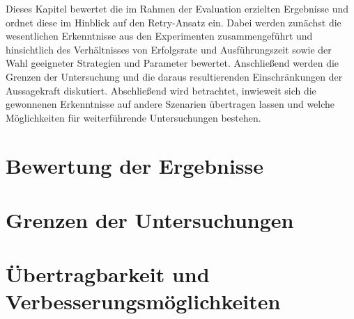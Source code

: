 
Dieses Kapitel bewertet die im Rahmen der Evaluation erzielten Ergebnisse und ordnet diese im Hinblick auf den
Retry-Ansatz ein.
Dabei werden zunächst die wesentlichen Erkenntnisse aus den Experimenten zusammengeführt und hinsichtlich des
Verhältnisses von Erfolgsrate und Ausführungszeit sowie der Wahl geeigneter Strategien und Parameter bewertet.
Anschließend werden die Grenzen der Untersuchung und die daraus resultierenden Einschränkungen der Aussagekraft
diskutiert.
Abschließend wird betrachtet, inwieweit sich die gewonnenen Erkenntnisse auf andere Szenarien übertragen lassen und
welche Möglichkeiten für weiterführende Untersuchungen bestehen.

\section{Bewertung der Ergebnisse}
\label{sec:evaluation}


\section{Grenzen der Untersuchungen}
\label{sec:boundaries}


\section{Übertragbarkeit und Verbesserungsmöglichkeiten}
\label{sec:transferability}
